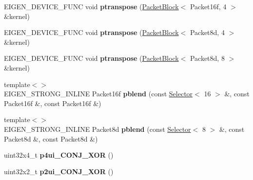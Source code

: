 \begin{DoxyCompactItemize}
\item 
\mbox{\label{namespace_eigen_1_1internal_a8033bdd3a9a207921418ac65472d4eda}} 
E\+I\+G\+E\+N\+\_\+\+D\+E\+V\+I\+C\+E\+\_\+\+F\+U\+NC void {\bfseries ptranspose} (\hyperlink{struct_eigen_1_1internal_1_1_packet_block}{Packet\+Block}$<$ Packet16f, 4 $>$ \&kernel)
\item 
\mbox{\label{namespace_eigen_1_1internal_a3c1dccc85f1b6dc6ce3fa15b4aaad827}} 
E\+I\+G\+E\+N\+\_\+\+D\+E\+V\+I\+C\+E\+\_\+\+F\+U\+NC void {\bfseries ptranspose} (\hyperlink{struct_eigen_1_1internal_1_1_packet_block}{Packet\+Block}$<$ Packet8d, 4 $>$ \&kernel)
\item 
\mbox{\label{namespace_eigen_1_1internal_a50bb7e86b5f6aafb1b2938ec95a73fa2}} 
E\+I\+G\+E\+N\+\_\+\+D\+E\+V\+I\+C\+E\+\_\+\+F\+U\+NC void {\bfseries ptranspose} (\hyperlink{struct_eigen_1_1internal_1_1_packet_block}{Packet\+Block}$<$ Packet8d, 8 $>$ \&kernel)
\item 
\mbox{\label{namespace_eigen_1_1internal_a350b35010acb6f967c8b3aba19cc4328}} 
{\footnotesize template$<$$>$ }\\E\+I\+G\+E\+N\+\_\+\+S\+T\+R\+O\+N\+G\+\_\+\+I\+N\+L\+I\+NE Packet16f {\bfseries pblend} (const \hyperlink{struct_eigen_1_1internal_1_1_selector}{Selector}$<$ 16 $>$ \&, const Packet16f \&, const Packet16f \&)
\item 
\mbox{\label{namespace_eigen_1_1internal_a116bc730d5c91e81e096f849bd756aa6}} 
{\footnotesize template$<$$>$ }\\E\+I\+G\+E\+N\+\_\+\+S\+T\+R\+O\+N\+G\+\_\+\+I\+N\+L\+I\+NE Packet8d {\bfseries pblend} (const \hyperlink{struct_eigen_1_1internal_1_1_selector}{Selector}$<$ 8 $>$ \&, const Packet8d \&, const Packet8d \&)
\item 
\mbox{\label{namespace_eigen_1_1internal_a5d1dbc597a77fa32bdc040a524b2750e}} 
uint32x4\+\_\+t {\bfseries p4ui\+\_\+\+C\+O\+N\+J\+\_\+\+X\+OR} ()
\item 
\mbox{\label{namespace_eigen_1_1internal_a067e7bdf2d1a3ffadd4e1ed2cf1e8a5a}} 
uint32x2\+\_\+t {\bfseries p2ui\+\_\+\+C\+O\+N\+J\+\_\+\+X\+OR} ()

\end{DoxyCompactItemize}
